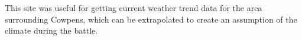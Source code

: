 This site was useful for getting current weather trend data for the
area surrounding Cowpens, which can be extrapolated to create an assumption of
the climate during the battle.

